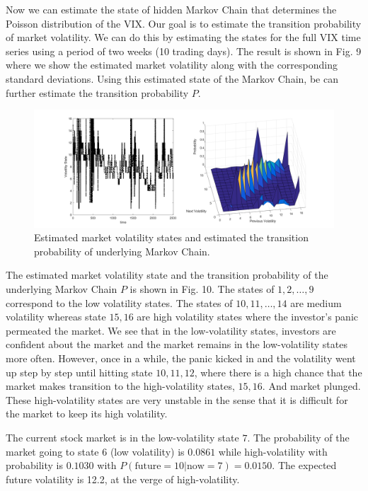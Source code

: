 \documentclass[a4paper, 11pt]{article}
\begin{document}
Now we can estimate the state of hidden Markov Chain that determines the Poisson distribution of the VIX. Our goal is to estimate the transition probability of market volatility. We can do this by estimating the states for the full VIX time series using a period of two weeks (10 trading days). The result is shown in Fig. 9 where we show the estimated market volatility along with the corresponding standard deviations. Using this estimated state of the Markov Chain, be can further estimate the transition probability $P$. 

\begin{figure}
	\begin{center}
		\includegraphics[width=6.5in]{p57d.png}
		\caption{Estimated market volatility states and estimated the transition probability of underlying Markov Chain.} 
	\end{center}
\end{figure}

The estimated market volatility state and the transition probability of the underlying Markov Chain $P$ is shown in Fig. 10. The states of $1,2,\dots, 9$ correspond to the low volatility states. The states of $10, 11, \dots, 14$ are medium volatility whereas state $15, 16$ are high volatility states where the investor's panic permeated the market. We see that in the low-volatility states, investors are confident about the market and the market remains in the low-volatility states more often. However, once in a while, the panic kicked in and the volatility went up step by step until hitting state $10, 11, 12$, where there is a high chance that the market makes transition to the high-volatility states, $15, 16$. And market plunged. These high-volatility states are very unstable in the sense that it is difficult for the market to keep its high volatility. 


The current stock market is in the low-volatility state $7$. The probability of the market going to state $6$ (low volatility) is $0.0861$ while high-volatility with probability is $0.1030$ with $P(\text{future}=10|\text{now}=7) = 0.0150$. The expected future volatility is 12.2, at the verge of high-volatility. 
\end{document}
